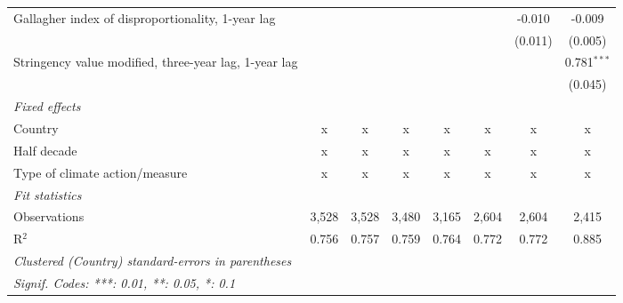 \begin{table}[htbp]
\begin{tabular}{lccccccc}
      Gallagher index of disproportionality, 1-year lag     &         &         &             &             &               & -0.010        & -0.009\\   
                                                            &         &         &             &             &               & (0.011)       & (0.005)\\   
      Stringency value modified, three-year lag, 1-year lag &         &         &             &             &               &               & 0.781$^{***}$\\   
                                                            &         &         &             &             &               &               & (0.045)\\   
      \emph{Fixed effects}\\
      Country                                               & x       & x       & x           & x           & x             & x             & x\\  
      Half decade                                           & x       & x       & x           & x           & x             & x             & x\\  
      Type of climate action/measure                        & x       & x       & x           & x           & x             & x             & x\\  
      \midrule \emph{Fit statistics}\\
      Observations                                          & 3,528   & 3,528   & 3,480       & 3,165       & 2,604         & 2,604         & 2,415\\  
      R$^2$                                                 & 0.756   & 0.757   & 0.759       & 0.764       & 0.772         & 0.772         & 0.885\\  
      \midrule
      \multicolumn{8}{l}{\emph{Clustered (Country) standard-errors in parentheses}}\\
      \multicolumn{8}{l}{\emph{Signif. Codes: ***: 0.01, **: 0.05, *: 0.1}}\\
   \end{tabular}
\end{table}


